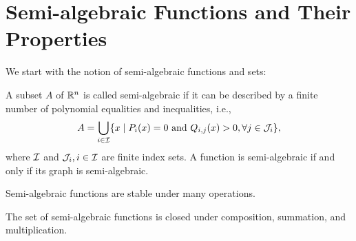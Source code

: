\section{Semi-algebraic Functions and Their Properties}
\label{appendix:semi-algebraic}
We start with the notion of semi-algebraic functions and sets:

\begin{definition}
	\label{def:semi-algebraic}
	A subset $A$ of $\mathbb{R}^n$ is called semi-algebraic if it can be described by a finite number of polynomial equalities and inequalities, i.e.,
	\begin{equation*}
		 A = \bigcup_{i \in \mathcal{I}} \{x \mid P_i(x) = 0 \text{ and } Q_{i,j}(x) > 0, \forall j \in \mathcal{J}_i\},
	\end{equation*}
	where $\mathcal{I}$ and $\mathcal{J}_i, i \in \mathcal{I}$ are finite index sets. A function is semi-algebraic if and only if its graph is semi-algebraic.
\end{definition}

Semi-algebraic functions are stable under many operations.

\begin{proposition}
    The set of semi-algebraic functions is closed under composition, summation, and multiplication.
\end{proposition}

